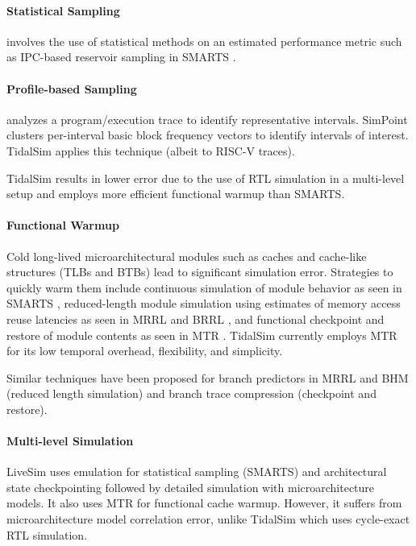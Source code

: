 \documentclass[sigplan,nonacm,10pt]{acmart}
\begin{document}
\paragraph{Statistical Sampling} involves the use of statistical methods on an estimated performance metric such as IPC-based reservoir sampling in SMARTS \cite{smarts}.

\paragraph{Profile-based Sampling} analyzes a program/execution trace to identify representative intervals. SimPoint \cite{simpoint3} clusters per-interval basic block frequency vectors to identify intervals of interest. TidalSim applies this technique (albeit to RISC-V traces).

TidalSim results in lower error due to the use of RTL simulation in a multi-level setup and employs more efficient functional warmup than SMARTS.

\paragraph{Functional Warmup} Cold long-lived microarchitectural modules such as caches and cache-like structures (TLBs and BTBs) lead to significant simulation error. Strategies to quickly warm them include continuous simulation of module behavior as seen in SMARTS \cite{smarts}, reduced-length module simulation using estimates of memory access reuse latencies as seen in MRRL \cite{haskins2003memory} and BRRL \cite{eeckhout2005blrl}, and functional checkpoint and restore of module contents as seen in MTR \cite{barr2005accelerating}. TidalSim currently employs MTR for its low temporal overhead, flexibility, and simplicity.

Similar techniques have been proposed for branch predictors in MRRL and BHM \cite{kluyskens2007branch} (reduced length simulation) and branch trace compression \cite{barr2006branch} (checkpoint and restore).

\paragraph{Multi-level Simulation} LiveSim \cite{hassani2016livesim} uses emulation for statistical sampling (SMARTS) and architectural state checkpointing followed by detailed simulation with microarchitecture models. It also uses MTR for functional cache warmup. However, it suffers from microarchitecture model correlation error, unlike TidalSim which uses cycle-exact RTL simulation.
\end{document}

